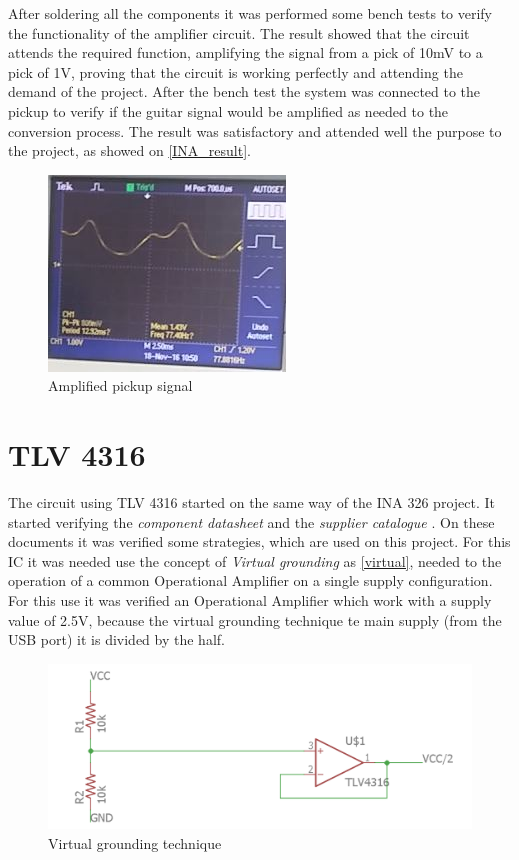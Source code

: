 After soldering all the components it was performed some bench tests to
verify the functionality of the amplifier circuit. The result showed that the
circuit attends the required function, amplifying the signal from a pick of 10mV
to a pick of 1V, proving that the circuit is working perfectly and attending the
demand of the project. After the bench test the system was connected to the pickup
to verify if the guitar signal would be amplified as needed to the conversion process.
The result was satisfactory and attended well the purpose to the project, as showed on \autoref{INA_result}.

\begin{figure}[!htpb]
\centering
\caption{Amplified pickup signal}
\label{INA_result}
\includegraphics[scale=1]{images/INA_result}
\end{figure}

\section{TLV 4316}
The circuit using TLV 4316 started on the same way of the INA 326 project.
It started verifying the \textit{component datasheet} \cite{TLV4316} and the \textit{supplier catalogue} \cite{OpAmps}.
On these documents it was verified some strategies, which are used on this project. For this IC it was needed use the
concept of \textit{Virtual grounding} \cite{OpAmps} as \autoref{virtual}, needed to the operation of a common Operational Amplifier on a single
supply configuration. For this use it was verified an Operational Amplifier which work with a supply value of 2.5V, because
the virtual grounding technique te main supply (from the USB port) it is divided by the half.\\

\begin{figure}[!htpb]
\centering
\caption{Virtual grounding technique}
\label{virtual}
\includegraphics[scale=0.3]{images/virtual}
\end{figure}

